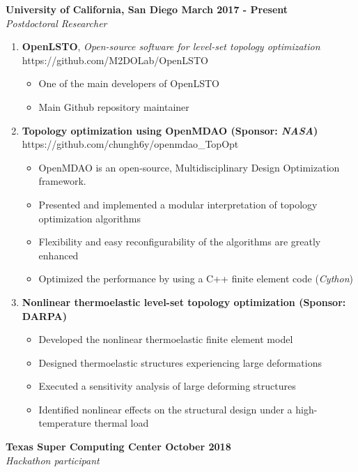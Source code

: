 \documentclass[margin, 10pt]{res} %
\begin{document}
\begin{resume}
\textbf{University of California, San Diego \hfill March 2017 - Present} \\
\textit{Postdoctoral Researcher} \\ 
\begin{enumerate}
    \item \textbf{OpenLSTO}, \textit{Open-source software for level-set topology optimization} 
    \\ https://github.com/M2DOLab/OpenLSTO
    \begin{itemize}
        \item One of the main developers of OpenLSTO
        \item Main Github repository maintainer
    \end{itemize}
    
    \item \textbf{Topology optimization using OpenMDAO (Sponsor: \textit{NASA})} \\
    https://github.com/chungh6y/openmdao\_TopOpt
    \begin{itemize}
        \item OpenMDAO is an open-source, Multidisciplinary Design Optimization framework. 
        \item Presented and implemented a modular interpretation of topology optimization algorithms
        \item Flexibility and easy reconfigurability of the algorithms are greatly enhanced
        \item Optimized the performance by using a C++ finite element code (\textit{Cython})
    \end{itemize}
    
    \item \textbf{Nonlinear thermoelastic level-set topology optimization (Sponsor: DARPA)}
    \begin{itemize}
        \item Developed the nonlinear thermoelastic finite element model
        \item Designed thermoelastic structures experiencing large deformations
        \item Executed a sensitivity analysis of large deforming structures
        \item Identified nonlinear effects on the structural design under a high-temperature thermal load
    \end{itemize}
\end{enumerate}

\textbf{Texas Super Computing Center \hfill October 2018} \\
\textit{Hackathon participant}


\end{resume}
\end{document}
